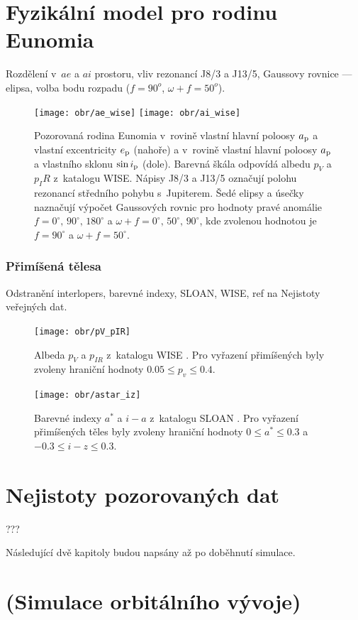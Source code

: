 \documentclass[A4paper, 12pt, oneside]{book}%
\begin{document}
\section{Fyzikální model pro rodinu Eunomia}
Rozdělení v~$ae$ a $ai$ prostoru, vliv rezonancí J8/3 a J13/5, Gaussovy rovnice --- elipsa, volba bodu rozpadu ($f=90^o$, $\omega+f=50^o$).
\begin{figure}[!htb]
	\centering
	\texttt{[image: obr/ae\_wise]}
	\texttt{[image: obr/ai\_wise]}
	\caption{Pozorovaná rodina Eunomia v~rovině vlastní hlavní poloosy $a_{\rm p}$ a vlastní excentricity $e_{\rm p}$ (nahoře) a v~rovině vlastní hlavní poloosy $a_{\rm p}$ a vlastního sklonu $\sin i_{\rm p}$ (dole). Barevná škála odpovídá albedu $p_V$ a $p_IR$ z~katalogu WISE. Nápisy J8/3 a J13/5 označují polohu rezonancí středního pohybu s~Jupiterem. Šedé elipsy a úsečky naznačují výpočet Gaussových rovnic pro hodnoty pravé anomálie $f=0^\circ,\,90^\circ,\,180^\circ$ a $\omega+f=0^\circ,\, 50^\circ,\, 90^\circ$, kde zvolenou hodnotou je $f=90^\circ$ a $\omega+f=50^\circ$.}
	\label{fig:ae_ai_wise}
\end{figure}
\subsubsection{Přimíšená tělesa}
Odstranění interlopers, barevné indexy, SLOAN, WISE, ref na Nejistoty veřejných dat.
\begin{figure}[!htb]
	\centering
	\texttt{[image: obr/pV\_pIR]}
	\caption{Albeda $p_V$ a $p_{IR}$ z~katalogu WISE \cite{nugent15}. Pro vyřazení přimíšených byly zvoleny hraniční hodnoty $0.05 \leq p_v \leq 0.4$.}
	\label{fig:pV_pIR}
\end{figure}
\begin{figure}[!htb]
	\centering
	\texttt{[image: obr/astar\_iz]}
	\caption{Barevné indexy $a^*$ a $i-a$ z~katalogu SLOAN \cite{ivezic01}. Pro vyřazení přimíšených těles byly zvoleny hraniční hodnoty $0\leq a^* \leq 0.3$ a $-0.3\leq i-z \leq 0.3$.}
	\label{fig:astar_iz}
\end{figure}
\section{Nejistoty pozorovaných dat}
???

Následující dvě kapitoly budou napsány až po doběhnutí simulace. 
\section{(Simulace orbitálního vývoje)}
\end{document}
